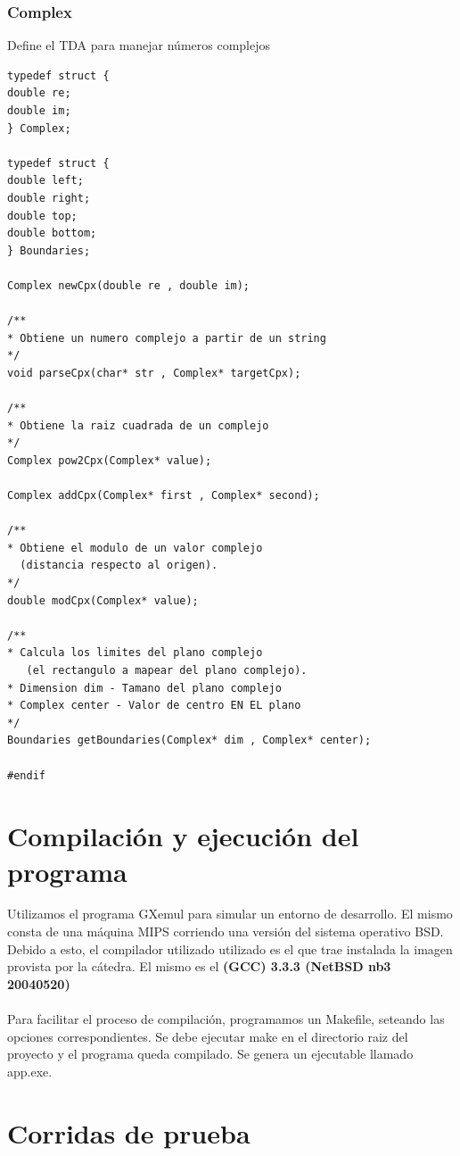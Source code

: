 \documentclass [12pt, a4paper]{article}
\begin{document}
	\subsubsection{\textbf{Complex}}
		Define el TDA para manejar números complejos
	\begin{lstlisting}[frame=single]
typedef struct {
double re;
double im;
} Complex;

typedef struct {
double left;
double right;
double top;
double bottom;
} Boundaries;

Complex newCpx(double re , double im);

/** 
* Obtiene un numero complejo a partir de un string
*/
void parseCpx(char* str , Complex* targetCpx);

/**
* Obtiene la raiz cuadrada de un complejo
*/
Complex pow2Cpx(Complex* value);

Complex addCpx(Complex* first , Complex* second);

/** 
* Obtiene el modulo de un valor complejo 
  (distancia respecto al origen).
*/
double modCpx(Complex* value);

/** 
* Calcula los limites del plano complejo 
   (el rectangulo a mapear del plano complejo).
* Dimension dim - Tamano del plano complejo
* Complex center - Valor de centro EN EL plano
*/
Boundaries getBoundaries(Complex* dim , Complex* center);

#endif

	\end{lstlisting}
	
	
	\clearpage
	\section{Compilación y ejecución del programa}
	
	Utilizamos el programa GXemul para simular un entorno de desarrollo. El mismo consta de una máquina MIPS corriendo una versión del sistema operativo BSD. Debido a esto, el compilador utilizado utilizado es el que trae instalada la imagen provista por la cátedra. El mismo es el \textbf{(GCC) 3.3.3 (NetBSD nb3 20040520)}
	\\\\
	Para facilitar el proceso de compilación, programamos un Makefile, seteando las opciones correspondientes. Se debe ejecutar make en el directorio raiz del proyecto y el programa queda compilado. Se genera un ejecutable llamado app.exe. 
	
	\section{Corridas de prueba}
\end{document}
